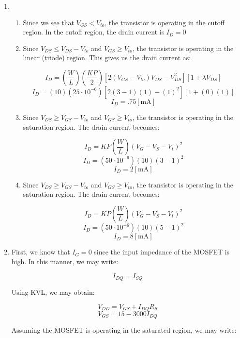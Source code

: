 \begin{enumerate}

  \item

    \begin{enumerate}

      \item Since we see that $V_{GS}<V_{to}$, the transistor is operating in the cutoff region. In the cutoff region, the drain current is $\boxed{I_D=0}$

      \item Since $V_{DS}\leq V_{DS}-V_{to}$ and $V_{GS}\geq V_{to}$, the transistor is operating in the linear (triode) region. This gives us the drain current as:

        $$I_D=\left( \frac{W}{L} \right)\left( \frac{KP}{2} \right)\left[ 2(V_{GS}-V_{to})V_{DS}-V_{DS}^2 \right]\left[ 1+\lambda V_{DS} \right]$$
        $$I_D=\left( 10 \right)\left( 25\cdot10^{-6} \right)\left[ 2(3-1)(1)-(1)^2 \right]\left[ 1+(0)(1) \right]$$
        $$\boxed{I_D=.75[\si{\milli\ampere}]}$$

      \item Since $V_{DS}\geq V_{GS}-V_{to}$ and $V_{GS}\geq V_{to}$, the transistor is operating in the saturation region. The drain current becomes:

        $$I_{D}=KP\left( \frac{W}{L} \right)(V_{G}-V_{S}-V_t)^2$$
        $$I_{D}=\left( 50\cdot10^{-6} \right)\left( 10 \right)(3-1)^2$$
        $$\boxed{I_{D}=2[\si{\milli\ampere}]}$$

      \item Since $V_{DS}\geq V_{GS}-V_{to}$ and $V_{GS}\geq V_{to}$, the transistor is operating in the saturation region. The drain current becomes:

        $$I_{D}=KP\left( \frac{W}{L} \right)(V_{G}-V_{S}-V_t)^2$$
        $$I_{D}=\left( 50\cdot10^{-6} \right)\left( 10 \right)(5-1)^2$$
        $$\boxed{I_{D}=8[\si{\milli\ampere}]}$$


    \end{enumerate}

  \item First, we know that $I_G=0$ since the input impedance of the MOSFET is high. In this manner, we may write:

    $$I_{DQ}=I_{SQ}$$

    Using KVL, we may obtain:

    $$V_{DD}=V_{GS}+I_{DQ}R_S$$
    $$V_{GS}=15-3000I_{DQ}$$

    Assuming the MOSFET is operating in the saturated region, we may write:


\end{enumerate}
